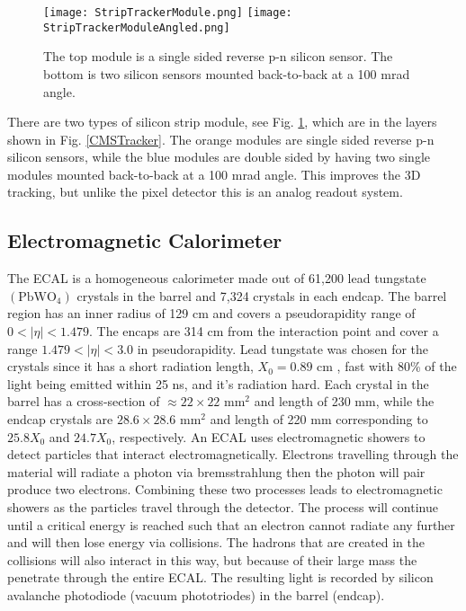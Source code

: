 \begin{figure}[!htb]
	\centering
	\texttt{[image: StripTrackerModule.png]}
	\texttt{[image: StripTrackerModuleAngled.png]}
	\caption[Strip Tracker Module]{The top module is a single sided reverse p-n silicon sensor. The bottom is two silicon sensors mounted back-to-back at a 100 mrad angle.}
 	\label{SiliconStrips} 
\end{figure}

There are two types of silicon strip module, see Fig. \ref{SiliconStrips}, which are in the layers shown in Fig. \ref{CMSTracker}. The orange modules are single sided reverse p-n silicon sensors, while the blue modules are double sided by having two single modules mounted back-to-back at a 100 mrad angle. This improves the 3D tracking, but unlike the pixel detector this is an analog readout system. 

\subsection{Electromagnetic Calorimeter}
\label{sec:ECAL}

The ECAL is a homogeneous calorimeter made out of 61,200 lead tungstate $(\text{PbWO}_4)$ crystals in the barrel and 7,324 crystals in each endcap. The barrel region has an inner radius of 129 cm and covers a pseudorapidity range of $0<|\eta|<1.479$. The encaps are 314 cm from the interaction point and cover a range $1.479<|\eta|<3.0$ in pseudorapidity. Lead tungstate was chosen for the crystals since it has a short radiation length, $X_0=0.89 \text{ cm }$, fast with 80\% of the light being emitted within 25 ns, and it's radiation hard. Each crystal in the barrel has a cross-section of $\approx22\times22 \text{ mm}^2$ and length of 230 mm, while the endcap crystals are $28.6\times28.6 \text{ mm}^2$ and length of 220 mm corresponding to $25.8X_0$ and $24.7X_0$, respectively. An ECAL uses electromagnetic showers to detect particles that interact electromagnetically. Electrons travelling through the material will radiate a photon via bremsstrahlung then the photon will pair produce two electrons. Combining these two processes leads to electromagnetic showers as the particles travel through the detector. The process will continue until a critical energy is reached such that an electron cannot radiate any further and will then lose energy via collisions. The hadrons that are created in the collisions will also interact in this way, but because of their large mass the penetrate through the entire ECAL. The resulting light is recorded by silicon avalanche photodiode (vacuum phototriodes) in the barrel (endcap). 

